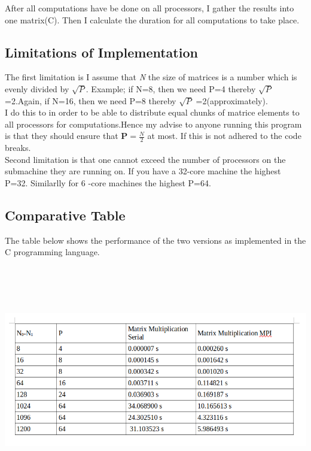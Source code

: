\documentclass[12pt, a4paper, fleqn, titlepage]{article}
\begin{document}
After all computations have be done on all processors, I gather the results into one matrix(C). Then I calculate the duration for all computations to take place.

\subsection{Limitations of Implementation}
The first limitation is I assume that \emph{N} the size of matrices is a number which is evenly divided by $\sqrt{P}$. Example; if N=8, then we need P=4 thereby $\sqrt{P}$ =2.Again,  if N=16, then we need P=8 thereby $\sqrt{P}$ =2(approximately). \\

I do this to in order to be able to distribute equal chunks of matrice elements to all processors for computations.Hence my advise to anyone running this program is that they should ensure that \textbf{P$= \frac{N}{2}$} at most. If this is not adhered to the code breaks.\\

Second limitation is that one cannot exceed the number of processors on the submachine they are running on. If you have a 32-core machine the highest P=32. Similarlly for 6
-core machines the highest P=64.



\subsection{Comparative Table}
    The table below shows the performance of the two versions as implemented in the C programming language.
    \begin{center}  
        \includegraphics[width= 18cm,height = 10cm, keepaspectratio,scale=0.5]{lab3-table}
    \end{center}
\end{document}
